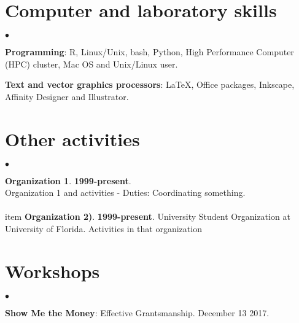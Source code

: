 \documentclass[margin,line]{res}
\newenvironment{list2}{
  \begin{list}{$\bullet$}{%
      \setlength{\itemsep}{0in}
      \setlength{\parsep}{0in} \setlength{\parskip}{0in}
      \setlength{\topsep}{0in} \setlength{\partopsep}{0in} 
      \setlength{\leftmargin}{0.2in}}}{\end{list}}
\begin{document}
\begin{resume}
\section{\sc Computer and laboratory skills} 
\begin{list2}
\item[] {\bf Programming}: R, Linux/Unix, bash, Python, High Performance Computer (HPC) cluster, Mac OS and Unix/Linux user.
\item[] {\bf Text and vector graphics processors}: {\LaTeX}, Office packages, Inkscape, Affinity Designer and Illustrator.
\end{list2}

\section{\sc Other activities}
\begin{list2}
\item {\bf Organization 1}. {\bf 1999-present}. \\
Organization 1 and activities 
\subitem- {\bf } Duties:  Coordinating something. \\ 
\\item {\bf Organization 2)}. {\bf 1999-present}. University Student Organization at University of Florida.
Activities in that organization    
\end{list2}





\section{\sc Workshops} 
\begin{list2}
\item {\bf Show Me the Money}: Effective Grantsmanship. December 13 2017. \\\vspace{0.05 cm}
\end{list2}

\end{resume}
\end{document}
